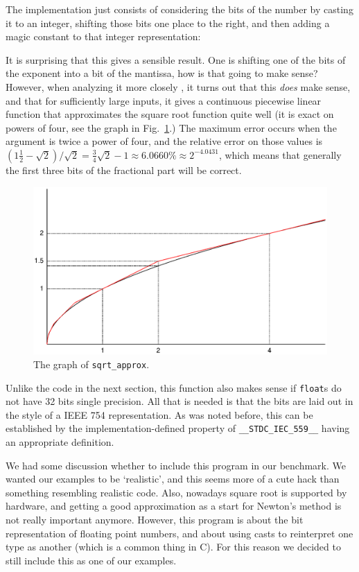 \documentclass{article}
\begin{document}
The implementation just consists of considering the bits of the number by casting it to an integer,
shifting those bits one place to the right, and then adding a magic constant to that integer representation:

It is surprising that this gives a sensible result.
One is shifting one of the bits of the exponent into a bit of the
mantissa, how is that going to make sense?
However, when analyzing it more closely \cite{bli:97}, it turns
out that this \emph{does} make sense, and that for sufficiently large inputs, it gives a continuous piecewise linear function that 
approximates the square root function quite well (it is exact
on powers of four, see the graph in Fig.~\ref{sqrt_approx}.)
The maximum error occurs when the argument is twice a power of four, and the
relative error on those values is $(1\frac{1}{2} - \sqrt{2})/\sqrt{2} = \frac{3}{4}\sqrt{2} - 1 \approx 6.0660\% \approx 2^{-4.0431}$,
which means that generally the first three bits of the fractional part will be correct.
\begin{figure}
\begin{center}
\includegraphics[width=.9\textwidth]{sqrt_approx}
\end{center}
\caption{The graph of \lstinline|sqrt_approx|.}\label{sqrt_approx}
\end{figure}

Unlike the code in the next section, this function also makes sense if \lstinline|float|s
do not have 32 bits single precision.
All that is needed is that the bits are laid out in the style of a
IEEE 754 representation.
As was noted before, this can be established by the implementation-defined
property of \lstinline|__STDC_IEC_559__| having an appropriate definition.

We had some discussion whether to include this program in our benchmark.
We wanted our examples to be `realistic', and this seems more of
a cute hack than something resembling realistic code.
Also, nowadays square root is supported by hardware, and getting a good approximation
as a start for Newton's method is not really important anymore.
However, this program is about the bit representation of floating point
numbers, and about using casts to reinterpret one type as another (which is
a common thing in C).
For this reason we decided to still include this
as one of our examples.
\end{document}
